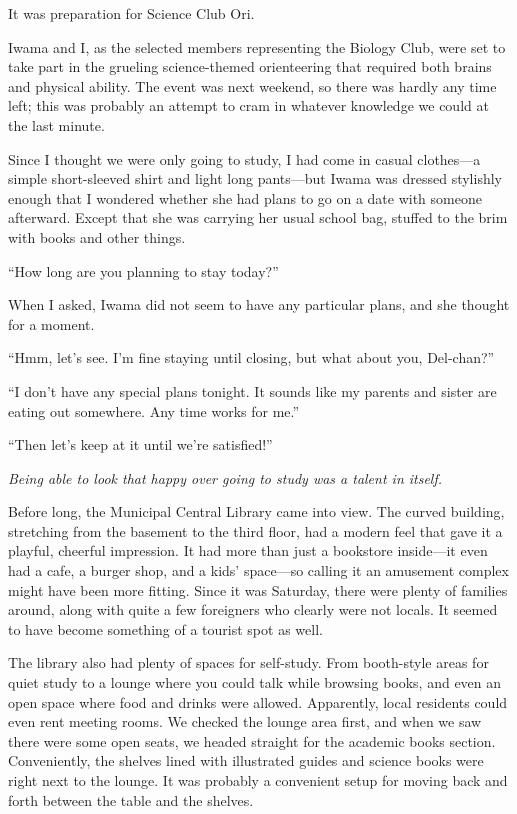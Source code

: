 \documentclass[
    a4paper,
    12pt,
    twoside,
    openany,
    UTF8,
    fontset=windows
]{ctexbook}
\begin{document}
It was preparation for Science Club Ori.

Iwama and I, as the selected members representing the Biology Club, were set to take part in the grueling science-themed orienteering that required both brains and physical ability. The event was next weekend, so there was hardly any time left; this was probably an attempt to cram in whatever knowledge we could at the last minute.

Since I thought we were only going to study, I had come in casual clothes---a simple short-sleeved shirt and light long pants---but Iwama was dressed stylishly enough that I wondered whether she had plans to go on a date with someone afterward. Except that she was carrying her usual school bag, stuffed to the brim with books and other things.

``How long are you planning to stay today?''

When I asked, Iwama did not seem to have any particular plans, and she thought for a moment.

``Hmm, let's see. I'm fine staying until closing, but what about you, Del-chan?''

``I don't have any special plans tonight. It sounds like my parents and sister are eating out somewhere. Any time works for me.''

``Then let's keep at it until we're satisfied!''

\textit{Being able to look that happy over going to study was a talent in itself.}

Before long, the Municipal Central Library came into view. The curved building, stretching from the basement to the third floor, had a modern feel that gave it a playful, cheerful impression. It had more than just a bookstore inside---it even had a cafe, a burger shop, and a kids' space---so calling it an amusement complex might have been more fitting. Since it was Saturday, there were plenty of families around, along with quite a few foreigners who clearly were not locals. It seemed to have become something of a tourist spot as well.

The library also had plenty of spaces for self-study. From booth-style areas for quiet study to a lounge where you could talk while browsing books, and even an open space where food and drinks were allowed. Apparently, local residents could even rent meeting rooms. We checked the lounge area first, and when we saw there were some open seats, we headed straight for the academic books section. Conveniently, the shelves lined with illustrated guides and science books were right next to the lounge. It was probably a convenient setup for moving back and forth between the table and the shelves.
\end{document}
